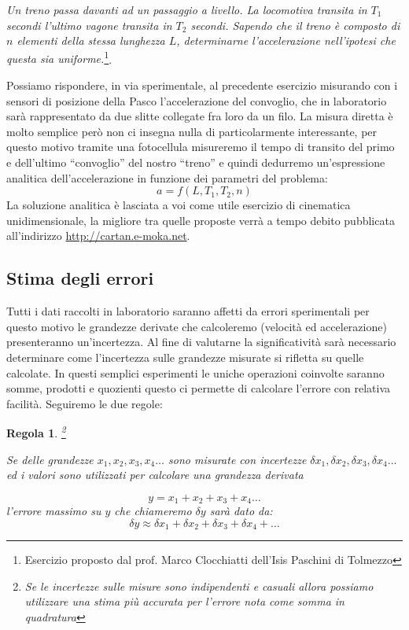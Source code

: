 \documentclass[a4paper,10pt,oneside]{article}
\newtheorem{regola}{Regola}
\begin{document}
\emph{Un treno passa davanti ad un passaggio a livello. La locomotiva transita in $T_1$ secondi l'ultimo vagone transita in $T_2$ secondi. Sapendo che il treno è composto di $n$ elementi della stessa lunghezza $L$, determinarne l'accelerazione nell'ipotesi che questa sia uniforme.}\footnote{Esercizio proposto dal prof. Marco Clocchiatti dell'Isis Paschini di Tolmezzo}.

Possiamo rispondere, in via sperimentale, al precedente esercizio misurando con i sensori di posizione della Pasco l'accelerazione del convoglio, che in laboratorio sarà rappresentato da due slitte collegate fra loro da un filo. La misura diretta è molto semplice però non ci insegna nulla di particolarmente interessante, per questo motivo tramite una fotocellula misureremo il tempo di transito del primo e dell'ultimo ``convoglio'' del nostro ``treno'' e quindi dedurremo un'espressione analitica dell'accelerazione in funzione  dei parametri del problema:
\begin{equation}
 a=f(L,T_1,T_2,n)
\end{equation}
La soluzione analitica  è lasciata a voi come utile esercizio di cinematica unidimensionale, la migliore tra quelle proposte verrà a tempo debito pubblicata all'indirizzo \url{http://cartan.e-moka.net}.

\subsection*{Stima degli errori}
Tutti i dati raccolti in laboratorio saranno affetti da errori sperimentali per questo motivo le grandezze derivate che calcoleremo (velocità ed accelerazione) presenteranno  un'incertezza. Al fine di valutarne la significatività sarà necessario determinare come l'incertezza sulle grandezze misurate si rifletta su quelle calcolate. In questi semplici esperimenti le uniche operazioni coinvolte saranno somme, prodotti e quozienti questo ci permette di calcolare l'errore con relativa facilità. Seguiremo le due regole:

\begin{regola}\footnote{Se le incertezze sulle misure sono indipendenti e casuali allora possiamo utilizzare una stima più accurata per l'errore nota come somma in quadratura}

Se delle grandezze $x_1,x_2,x_3,x_4\ldots$ sono misurate con incertezze $\delta x_1,\delta x_2,\delta x_3, \delta x_4\ldots$ ed i valori sono utilizzati per calcolare una grandezza derivata

\begin{equation*}
y=x_1+x_2+x_3+x_4\ldots
\end{equation*}
l'errore massimo su $y$ che chiameremo $\delta y$ sarà dato da:
\begin{equation*}
 \delta y\approx\delta x_1+\delta x_2+\delta x_3+\delta x_4+\ldots
\end{equation*}
\end{regola}
\end{document}
